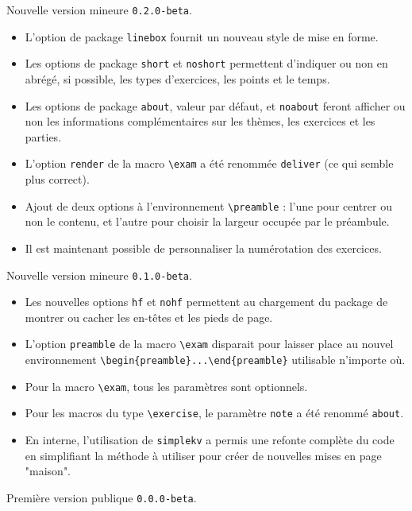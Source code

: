 \documentclass[12pt,a4paper]{scrartcl}
\begin{document}
\begin{description}[leftmargin=1em]
    \item[2017-11-28] Nouvelle version mineure \verb+0.2.0-beta+.
    \begin{itemize}
        \item L'option de package \verb+linebox+ fournit un nouveau style de mise en forme.

        \item Les options de package \verb+short+ et \verb+noshort+ permettent d'indiquer ou non en abrégé, si possible, les types d'exercices, les points et le temps.

        \item Les options de package \verb+about+, valeur par défaut, et \verb+noabout+ feront afficher ou non les informations complémentaires sur les thèmes, les exercices et les parties.

        \item L'option \verb+render+ de la macro \verb+\exam+ a été renommée \verb+deliver+ (ce qui semble plus correct).

        \item Ajout de deux options à l'environnement \verb+\preamble+ : l'une pour centrer ou non le contenu, et l'autre pour choisir la largeur occupée par le préambule.

        \item Il est maintenant possible de personnaliser la numérotation des exercices.
    \end{itemize}


    \item[2017-11-12] Nouvelle version mineure \verb+0.1.0-beta+.
    \begin{itemize}
        \item Les nouvelles options \verb+hf+ et \verb+nohf+ permettent au chargement du package de montrer ou cacher les en-têtes et les pieds de page.

        \item L'option \verb+preamble+ de la macro \verb+\exam+ disparait pour laisser place au nouvel environnement \verb+\begin{preamble}...\end{preamble}+ utilisable n'importe où.

        \item Pour la macro \verb+\exam+, tous les paramètres sont optionnels.

        \item Pour les macros du type \verb+\exercise+, le paramètre \verb+note+ a été renommé \verb+about+.

        \item En interne, l'utilisation de \verb+simplekv+ a permis une refonte complète du code en simplifiant la méthode à utiliser pour créer de nouvelles mises en page "maison".
    \end{itemize}


    \item[2017-11-03] Première version publique \verb+0.0.0-beta+.
\end{description}
\end{document}
